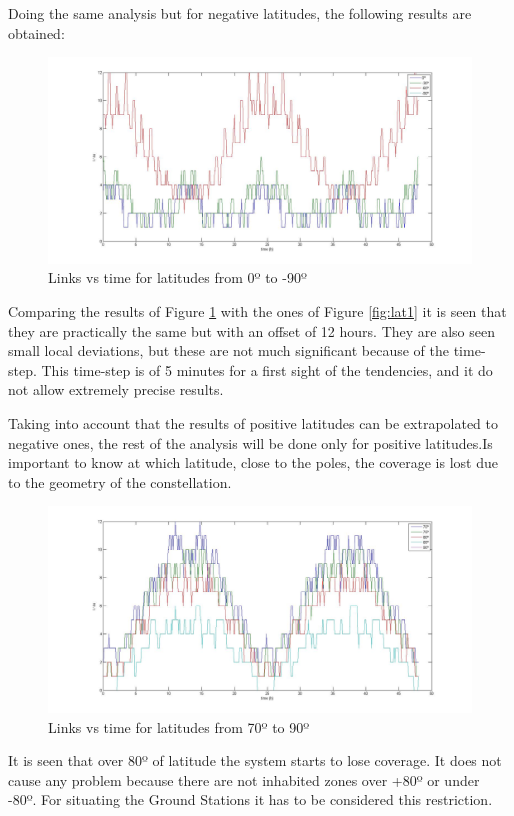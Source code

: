 Doing the same analysis but for negative latitudes, the following results are obtained:
\begin{figure}[H]
\begin{center}
\includegraphics[scale=0.30]{0_-30_-90_lat.jpg}
\caption{Links vs time for latitudes from 0º to -90º}
\label{fig:lat2}
\end{center}
\end{figure}
Comparing the results of Figure \ref{fig:lat2} with the ones of Figure \ref{fig:lat1} it is seen that they are practically the same but with an offset of 12 hours. They are also seen small local deviations, but these are not much significant because of the time-step. This time-step is of 5 minutes for a first sight of the tendencies, and it do not allow extremely precise results.

Taking into account that the results of positive latitudes can be extrapolated to negative ones, the rest of the analysis will be done only for positive latitudes.Is important to know at which latitude, close to the poles, the coverage is lost due to the geometry of the constellation.
\begin{figure}[H]
\begin{center}
\includegraphics[scale=0.30]{70_5_90_lat.jpg}
\caption{Links vs time for latitudes from 70º to 90º}
\label{fig:lat3}
\end{center}
\end{figure}
It is seen that over 80º of latitude the system starts to lose coverage. It does not cause any problem because there are not inhabited zones over +80º or under -80º. For situating the Ground Stations it has to be considered this restriction.

